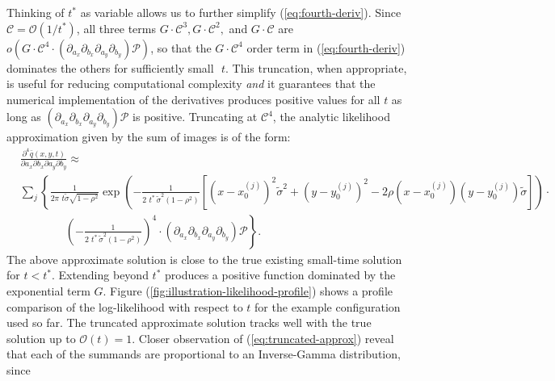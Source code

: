 Thinking of $t^{*}$ as variable allows us to further simplify
(\ref{eq:fourth-deriv}). Since $\mathcal{C} = \mathcal{O}(1/t^{*})$,
all three terms $G\cdot \mathcal{C}^3, G\cdot \mathcal{C}^2,$ and
$G\cdot \mathcal{C}$ are
$o\left( G\cdot \mathcal{C}^4 \cdot \left(\partial_{a_x}\partial_{b_x}
    \partial_{a_y}\partial_{b_y} \right)\mathcal{P} \right)$, so that
the $G\cdot \mathcal{C}^4$ order term in (\ref{eq:fourth-deriv})
dominates the others for sufficiently small $\,\,t$. This truncation,
when appropriate, is useful for reducing computational complexity
\textit{and} it guarantees that the numerical implementation of the
derivatives produces positive values for all $t$ as long as
$\left(\partial_{a_x}\partial_{b_x} \partial_{a_y}\partial_{b_y}
\right)\mathcal{P}$ is positive. Truncating at $\mathcal{C}^4$, the
analytic likelihood approximation given by the sum of images is of the
form:
\begin{align}
  &\frac{\partial^4 \bar{q}(x, y, t)}{\partial a_x
  \partial b_x \partial a_y \partial b_y} \approx  & \nonumber \\
  &\sum_{j} \left\{ \frac{1}{2\pi\,\, t\tilde{\sigma}\sqrt{1-\rho^2}} \exp\left(
    -\frac{1}{2\,\,t^*\, \tilde{\sigma}^2 (1-\rho^2)} \left[
      \left(x-x_0^{(j)}\right)^2 \tilde{\sigma}^2 +
      \left(y-y_0^{(j)}\right)^2 -
      2\rho(x-x_0^{(j)})(y-y_0^{(j)})\tilde{\sigma} \right]\right)
    \cdot \right. & \nonumber \\
  &\qquad \qquad \left. \left( -\frac{1}{2\,\,t^*\, \tilde{\sigma}^2 (1-\rho^2)} \right)^4 \cdot \left(\partial_{a_x}\partial_{b_x}
    \partial_{a_y}\partial_{b_y} \right)\mathcal{P} \right\}. & \label{eq:truncated-approx}
\end{align}
The above approximate solution is close to the true existing
small-time solution for $t < t^*$. Extending beyond $t^*$ produces a
positive function dominated by the exponential term $G$. Figure
(\ref{fig:illustration-likelihood-profile}) shows a profile comparison
of the log-likelihood with respect to $t$ for the example
configuration used so far. The truncated approximate solution tracks
well with the true solution up to $\mathcal{O}(t) = 1$. Closer
observation of (\ref{eq:truncated-approx}) reveal that each of the
summands are proportional to an Inverse-Gamma distribution, since
